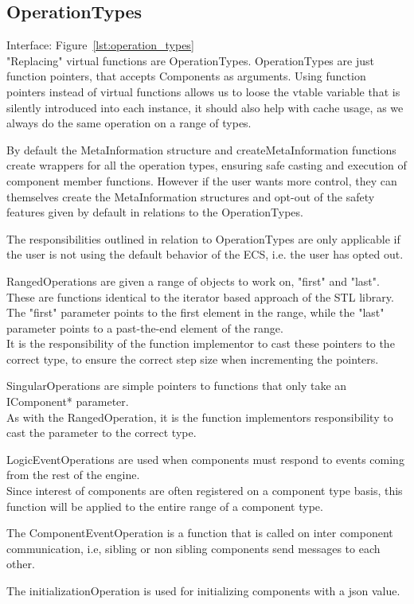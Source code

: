 \subsection{OperationTypes}
Interface: Figure~\ref{lst:operation_types}\\\noindent
"Replacing" virtual functions are OperationTypes.
OperationTypes are just function pointers, that accepts Components as arguments.
Using function pointers instead of virtual functions allows us to loose
the vtable variable that is silently introduced into each instance,
it should also help with cache usage, as we always do the same operation on a range of types.

By default the MetaInformation structure and createMetaInformation functions 
create wrappers for all the operation types, ensuring safe casting and execution of component member functions.
However if the user wants more control, they can themselves create the MetaInformation structures and opt-out of the safety features given by default in relations to the OperationTypes.

The responsibilities outlined in relation to OperationTypes are only applicable if the user is not using the default behavior of the ECS, i.e. the user has opted out.

RangedOperations are given a range of objects to work on, "first" and "last".
These are functions identical to the iterator based approach of the STL library.\\
The "first" parameter points to the first element in the range, while the "last" parameter points to a past-the-end element of the range.\\
It is the responsibility of the function implementor to cast these pointers to the correct type, 
to ensure the correct step size when incrementing the pointers.

SingularOperations are simple pointers to functions that only take an IComponent* parameter.\\
As with the RangedOperation, it is the function implementors responsibility to cast the parameter to the correct type.

LogicEventOperations are used when components must respond to events coming from the rest of the engine.\\
Since interest of components are often registered on a component type basis,
this function will be applied to the entire range of a component type.

The ComponentEventOperation is a function that is called on inter component communication, i.e, 
sibling or non sibling components send messages to each other.

The initializationOperation is used for initializing components with a json value.
